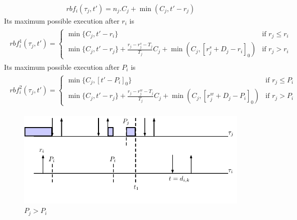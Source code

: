 \documentclass[12pt,conference,onecolumn]{IEEEtran}
\begin{document}
	\begin{align*}
		rbf_i(\tau_j,t')=n_j.C_j +\min(C_j,t'-r_j)
	\end{align*}
Its maximum possible execution after $r_i$ is
	\begin{align*}
	\begin{split}
	rbf_{i}^1(\tau_j,t')=
	\begin{cases}
	\min\{C_j, t'-r_i\}&\mbox{if } r_j\leq r_i\\
	\min\{C_j, t'-r_j\}+\frac{r_j-r_j^s-T_j}{T_j}C_j+\min(C_j,[r_j^s+D_j-r_i]_0)  &\mbox{if } r_j>r_i
	\end{cases}
	\end{split}
	\end{align*}
Its maximum possible execution after $P_i$ is
	\begin{align*}
	\begin{split}
	rbf_{i}^2(\tau_j,t')=
	\begin{cases}
	\min\{C_j, [t'-P_i]_0\}&\mbox{if } r_j\leq P_i\\
	\min\{C_j, t'-r_j\}+\frac{r_j-r_j^w-T_j}{T_j}C_j+\min(C_j,[r_j^w+D_j-P_i]_0)  &\mbox{if } r_j>P_i
	\end{cases}
	\end{split}
	\end{align*}





\begin{figure}[h!]
 \centering
\includegraphics[scale=1]{Figure/C2}  
\caption{$P_j> P_i$}
  \label{fig:case2}
\end{figure}
\end{document}
